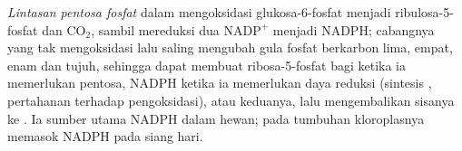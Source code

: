 \begin{definition}\label{def:b1:biosyntheses-integration:ppp}
\emph{Lintasan pentosa fosfat} dalam  mengoksidasi
glukosa-6-fosfat menjadi ribulosa-5-fosfat dan $\mathrm{CO_2}$, sambil
mereduksi dua $\mathrm{NADP^+}$ menjadi NADPH; cabangnya yang tak
mengoksidasi lalu saling mengubah gula fosfat berkarbon lima, empat,
enam dan tujuh, sehingga  dapat membuat ribosa-5-fosfat bagi
 ketika ia memerlukan pentosa, NADPH ketika ia memerlukan
daya reduksi (sintesis , pertahanan terhadap pengoksidasi), atau
keduanya, lalu mengembalikan sisanya ke . Ia sumber utama
NADPH dalam  hewan; pada tumbuhan  kloroplasnya memasok
NADPH pada siang hari.
\end{definition}

